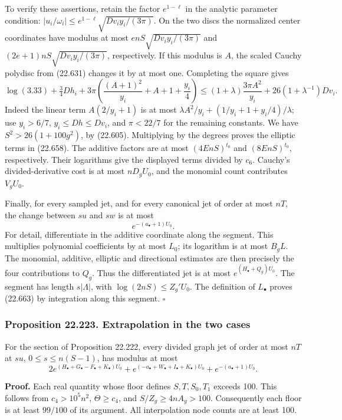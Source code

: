 \documentclass[
  11pt,
  a4paper,
]{article}
\begin{document}
To verify these assertions, retain the factor \(e^{1-\ell}\) in the
analytic parameter condition:
\(|u_i/\omega_i|\le e^{1-\ell}\sqrt{Dv_i y_i/(3\pi)}\). On the two discs
the normalized center coordinates have modulus at most
\(enS\sqrt{Dv_i y_i/(3\pi)}\) and \((2e+1)nS\sqrt{Dv_i y_i/(3\pi)}\),
respectively. If this modulus is \(A\), the scaled Cauchy polydisc from
(22.631) changes it by at most one. Completing the square gives \[
 \log(3.33)+\tfrac34Dh_i+
 3\pi\left(\frac{(A+1)^2}{y_i}+A+1+\frac{y_i}{4}\right)
 \le(1+\lambda)\frac{3\pi A^2}{y_i}
                         +26(1+\lambda^{-1})Dv_i.
 \tag{22.662}
\] Indeed the linear term \(A(2/y_i+1)\) is at most
\(\lambda A^2/y_i+(1/y_i+1+y_i/4)/\lambda\); use \(y_i>6/7\),
\(y_i\le Dh\le Dv_i\), and \(\pi<22/7\) for the remaining constants. We
have \(S^2>26(1+100g^2)\), by (22.605). Multiplying by the degrees
proves the elliptic terms in (22.658). The additive factors are at most
\((4EnS)^{t_0}\) and \((8EnS)^{t_0}\), respectively. Their logarithms
give the displayed terms divided by \(c_6\). Cauchy's divided-derivative
cost is at most \(nD_gU_0\), and the monomial count contributes
\(V_gU_0\).

Finally, for every sampled jet, and for every canonical jet of order at
most \(nT\), the change between \(su\) and \(sw\) is at most \[
 e^{-(a_\bullet+1)U_0}.
 \tag{22.663}
\] For detail, differentiate in the additive coordinate along the
segment. This multiplies polynomial coefficients by at most \(L_0\); its
logarithm is at most \(B_gL\). The monomial, additive, elliptic and
directional estimates are then precisely the four contributions to
\(Q_g\). Thus the differentiated jet is at most
\(e^{(H_\bullet+Q_g)U_0}\). The segment has length \(s|\Lambda|\), with
\(\log(2nS)\le Z_g'U_0\). The definition of \(L_\bullet\) proves
(22.663) by integration along this segment. \(\square\)

\subsubsection{Proposition 22.223. Extrapolation in the two
cases}\label{proposition-22.223.-extrapolation-in-the-two-cases}

For the section of Proposition 22.222, every divided graph jet of order
at most \(nT\) at \(su\), \(0\le s\le n(S-1)\), has modulus at most \[
 2e^{(H_\bullet+G_\bullet-F_\bullet+K_\bullet)U_0}
 +e^{(-a_\bullet+W_\bullet+I_\bullet+K_\bullet)U_0}
 +e^{-(a_\bullet+1)U_0}.
 \tag{22.664}
\]

\textbf{Proof.} Each real quantity whose floor defines \(S,T,S_0,T_1\)
exceeds 100. This follows from \(c_4>10^5n^2\), \(\Theta\ge c_4\), and
\(S/Z_g\ge4nA_g>100\). Consequently each floor is at least \(99/100\) of
its argument. All interpolation node counts are at least 100.
\end{document}
